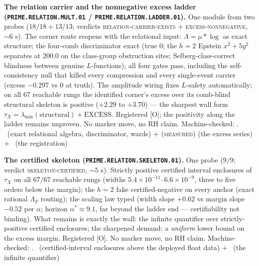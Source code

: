 \documentclass[11pt,a4paper]{article}
\theoremstyle{definition}
\begin{document}
\par\smallskip\noindent\textbf{The relation carrier and the
nonnegative excess ladder (\texttt{PRIME.RELATION.MULT.01} /
\texttt{PRIME.RELATION.LADDER.01}).}
One module from two probes ($18/18 + 13/13$; verdicts
\textsc{relation-carrier-exists} $+$ \textsc{excess-nonnegative},
$\sim6$ s).  The corner route reopens with the relational input:
$\Lambda = \mu * \log$ as exact structure; the four-comb
discriminator exact (true $0$; the $h = 2$ Epstein $x^2 + 5y^2$
separates at $200.0$ on the class-group obstruction sites;
Selberg-class-correct blindness between genuine $L$-functions);
all four gates pass, including the self-consistency null that
killed every compression and every single-event carrier (excess
$-0.297$ vs $0$ at truth).  The amplitude wiring fixes
$L$-safety automatically; on all $67$ reachable rungs the
identified corner's excess over its comb-blind structural
skeleton is positive ($+2.29$ to $+3.70$) --- the sharpest wall
form $\tau_X = \lambda_{\min}(\text{structural}) + \text{EXCESS}$.
Registered [O]; the positivity along the ladder remains unproven.
No marker move, no RH claim.
Machine-checked: .
\mE\ (exact relational algebra, discriminator, wards) $+$
(\textsc{measured}) (the excess series) $+$ \mO\ (the
registration)
\par\smallskip

\par\smallskip\noindent\textbf{The certified skeleton
(\texttt{PRIME.RELATION.SKELETON.01}).}
One probe ($9/9$; verdict \textsc{skeleton-certified}, $\sim5$ s).
Strictly positive certified interval enclosures of $\tau_X$ on all
$67/67$ reachable rungs (widths
$5.4\times10^{-11}$--$6.6\times10^{-9}$, three to five orders
below the margin); the $h = 2$ fake certified-negative on every
anchor (exact rational $\Lambda_F$ routing); the scaling law typed
(width slope $+0.62$ vs margin slope $-0.52$ per $\alpha$; horizon
$\alpha^* \approx 9.1$, far beyond the ladder end ---
certifiability not binding).  What remains is exactly the wall:
the infinite quantifier over strictly-positive certified
enclosures; the sharpened demand: a \emph{uniform} lower bound on
the excess margin.  Registered [O].  No marker move, no RH claim.
Machine-checked: .
\mE\ (certified-interval enclosures above the deployed float
data) $+$ \mO\ (the infinite quantifier)
\par\smallskip
\end{document}
